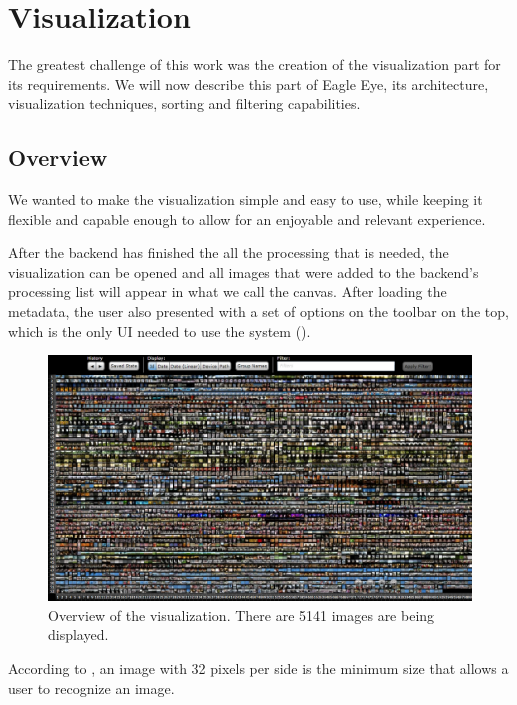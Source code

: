 \section{Visualization} %
\label{sub:visualization}

The greatest challenge of this work was the creation of the visualization part for its requirements. We will now describe this part of Eagle Eye, its architecture, visualization techniques, sorting and filtering capabilities.

\subsection{Overview}
We wanted to make the visualization simple and easy to use, while keeping it flexible and capable enough to allow for an enjoyable and relevant experience.

After the backend has finished the all the processing that is needed, the visualization can be opened and all images that were added to the backend's processing list will appear in what we call the canvas. After loading the metadata, the user also presented with a set of options on the toolbar on the top, which is the only \ac{UI} needed to use the system ().

\begin{figure}[ht]
	\centering
		\includegraphics[width=\columnwidth]{Figures/viz5141images1082.png}
	\caption{Overview of the visualization. There are 5141 images are being displayed.}
	\label{fig:viz5141images}
\end{figure}

According to , an image with 32 pixels per side is the minimum size that allows a user to recognize an image.


